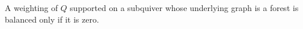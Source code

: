 \begin{corollary}\label{Arden24v2-cor-5.2}
\label{Arden24v2-cor:subquiver}
A weighting of $Q$ supported on a subquiver whose underlying graph is a forest is balanced only if it is zero.
\end{corollary}